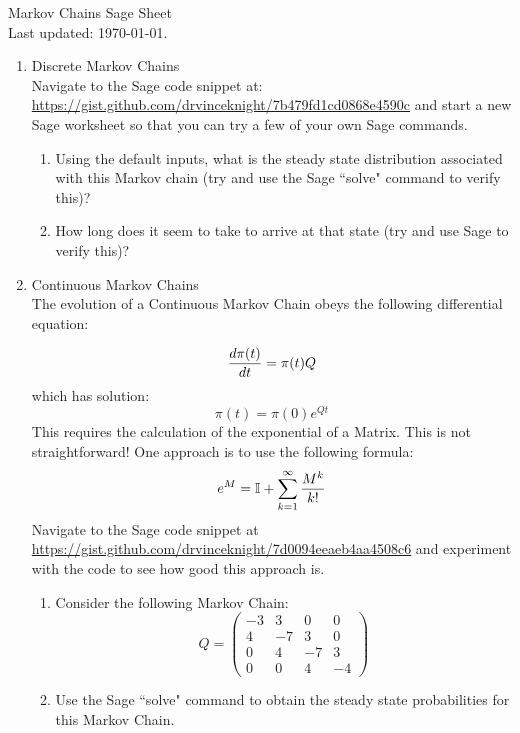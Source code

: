 \documentclass[12pt]{article}
\begin{document}
\begin{center}
\Huge{Markov Chains Sage Sheet}\\
\tiny{Last updated: \today.}
\end{center}

\begin{enumerate}
\item Discrete Markov Chains\\
Navigate to the Sage code snippet at: \url{https://gist.github.com/drvinceknight/7b479fd1cd0868e4590c} and start a new Sage worksheet so that you can try a few of your own Sage commands.

\begin{enumerate}
\item Using the default inputs, what is the steady state distribution associated with this Markov chain (try and use the Sage ``solve" command to verify this)?
\item How long does it seem to take to arrive at that state (try and use Sage to verify this)?
\end{enumerate}
\item Continuous Markov Chains\\
The evolution of a Continuous Markov Chain obeys the following differential equation:

$${d\pi(t)\over dt}=\pi(t)Q$$
which has solution:
$$\pi(t)=\pi(0)e^{Qt}$$
This requires the calculation of the exponential of a Matrix. This is not straightforward! One approach is to use the following formula:
$$
e^{M}=\mathbb{I}+\sum_{k=1}^{\infty}{M^k\over k!}
$$
Navigate to the Sage code snippet at \url{https://gist.github.com/drvinceknight/7d0094eeaeb4aa4508c6} and experiment with the code to see how good this approach is.
\begin{enumerate}
\item Consider the following Markov Chain:
$$Q=\begin{pmatrix}
-3&3&0&0\\
4&-7&3&0\\
0&4&-7&3\\
0&0&4&-4
\end{pmatrix}$$
\item Use the Sage ``solve" command to obtain the steady state probabilities for this Markov Chain.
\end{enumerate}
\end{enumerate}
\end{document}
